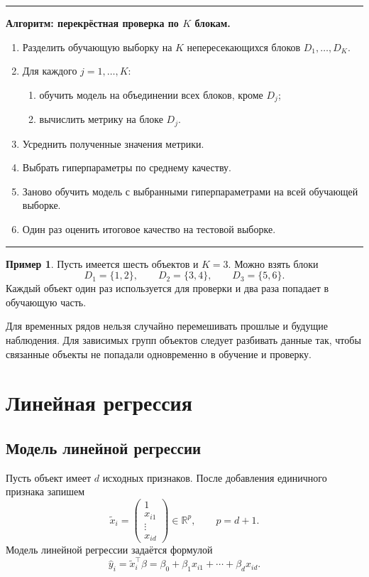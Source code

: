 \documentclass[12pt,a4paper]{article}
\theoremstyle{definition}
\newtheorem{example}[theorem]{Пример}
\theoremstyle{remark}
\newcommand{\R}{\mathbb{R}}
\newenvironment{algorithmbox}[1]
{
    \begin{center}
    \begin{minipage}{0.96\textwidth}
    \hrule
    \medskip
    \textbf{Алгоритм: #1.}
    \par\smallskip
}
{
    \medskip
    \hrule
    \end{minipage}
    \end{center}
}
\begin{document}
\begin{algorithmbox}{перекрёстная проверка по $K$ блокам}
\begin{enumerate}
    \item Разделить обучающую выборку на $K$ непересекающихся блоков
          $D_1,\ldots,D_K$.
    \item Для каждого $j=1,\ldots,K$:
    \begin{enumerate}
        \item обучить модель на объединении всех блоков, кроме $D_j$;
        \item вычислить метрику на блоке $D_j$.
    \end{enumerate}
    \item Усреднить полученные значения метрики.
    \item Выбрать гиперпараметры по среднему качеству.
    \item Заново обучить модель с выбранными гиперпараметрами на всей
          обучающей выборке.
    \item Один раз оценить итоговое качество на тестовой выборке.
\end{enumerate}
\end{algorithmbox}

\begin{example}
Пусть имеется шесть объектов и $K=3$. Можно взять блоки
\[
    D_1=\{1,2\},\qquad
    D_2=\{3,4\},\qquad
    D_3=\{5,6\}.
\]
Каждый объект один раз используется для проверки и два раза попадает
в обучающую часть.
\end{example}

Для временных рядов нельзя случайно перемешивать прошлые и будущие
наблюдения. Для зависимых групп объектов следует разбивать данные так,
чтобы связанные объекты не попадали одновременно в обучение и проверку.

\section{Линейная регрессия}

\subsection{Модель линейной регрессии}

Пусть объект имеет $d$ исходных признаков. После добавления единичного
признака запишем
\[
    \widetilde x_i
    =
    \begin{pmatrix}
        1\\x_{i1}\\ \vdots\\x_{id}
    \end{pmatrix}
    \in\R^p,
    \qquad p=d+1.
\]
Модель линейной регрессии задаётся формулой
\[
    \widehat y_i
    =
    \widetilde x_i^\top\beta
    =
    \beta_0+\beta_1x_{i1}+\cdots+\beta_dx_{id}.
\]
\end{document}
